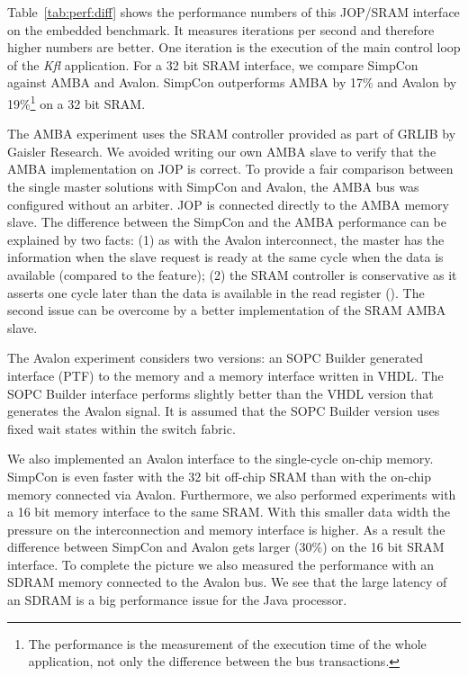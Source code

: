 Table~\ref{tab:perf:diff} shows the performance numbers of this
JOP/SRAM interface on the embedded benchmark. It measures iterations
per second and therefore higher numbers are better. One iteration is
the execution of the main control loop of the \emph{Kfl} application.
For a 32 bit SRAM interface, we compare SimpCon against AMBA and
Avalon. SimpCon outperforms AMBA by 17\% and Avalon by
19\%\footnote{The performance is the measurement of the execution
time of the whole application, not only the difference between the
bus transactions.} on a 32 bit SRAM.

The AMBA experiment uses the SRAM controller provided as part of
GRLIB \cite{grlib} by Gaisler Research. We avoided writing our own
AMBA slave to verify that the AMBA implementation on JOP is correct.
To provide a fair comparison between the single master solutions with
SimpCon and Avalon, the AMBA bus was configured without an arbiter.
JOP is connected directly to the AMBA memory slave. The difference
between the SimpCon and the AMBA performance can be explained by two
facts: (1) as with the Avalon interconnect, the master has the
information when the slave request is ready at the same cycle when
the data is available (compared to the  feature); (2)
the SRAM controller is conservative as it asserts  one
cycle later than the data is available in the read register
(). The second issue can be overcome by a better
implementation of the SRAM AMBA slave.


The Avalon experiment considers two versions: an SOPC Builder
generated interface (PTF) to the memory and a memory interface
written in VHDL. The SOPC Builder interface performs slightly better
than the VHDL version that generates the Avalon 
signal. It is assumed that the SOPC Builder version uses fixed wait
states within the switch fabric.

We also implemented an Avalon interface to the single-cycle on-chip
memory. SimpCon is even faster with the 32 bit off-chip SRAM than
with the on-chip memory connected via Avalon. Furthermore, we also
performed experiments with a 16 bit memory interface to the same
SRAM. With this smaller data width the pressure on the
interconnection and memory interface is higher. As a result the
difference between SimpCon and Avalon gets larger (30\%) on the 16
bit SRAM interface. To complete the picture we also measured the
performance with an SDRAM memory connected to the Avalon bus. We see
that the large latency of an SDRAM is a big performance issue for
the Java processor.

